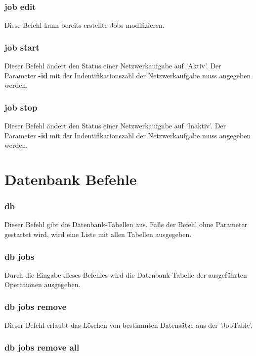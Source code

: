 \documentclass[12pt,a4paper]{report}
\begin{document}
\begin{onehalfspace}
\subsubsection{job edit}

Diese Befehl kann bereits erstellte Jobs modifizieren. 

\subsubsection{job start}

Dieser Befehl ändert den Status einer Netzwerkaufgabe auf 'Aktiv'. Der Parameter \textbf{-id} mit der Indentifikationszahl der Netzwerkaufgabe muss angegeben werden.

\subsubsection{job stop}

Dieser Befehl ändert den Status einer Netzwerkaufgabe auf 'Inaktiv'. Der Parameter \textbf{-id} mit der Indentifikationszahl der Netzwerkaufgabe muss angegeben werden.

\section{Datenbank Befehle}

\subsubsection{db}

Dieser Befehl gibt die Datenbank-Tabellen aus. Falls der Befehl ohne Parameter gestartet wird, wird eine Liste mit allen Tabellen ausgegeben.

\subsubsection{db jobs}

Durch die Eingabe dieses Befehles wird die Datenbank-Tabelle der ausgeführten Operationen ausgegeben.

\subsubsection{db jobs remove}

Dieser Befehl erlaubt das Löschen von bestimmten Datensätze aus der 'JobTable'.

\subsubsection{db jobs remove all}


\end{onehalfspace}
\end{document}
